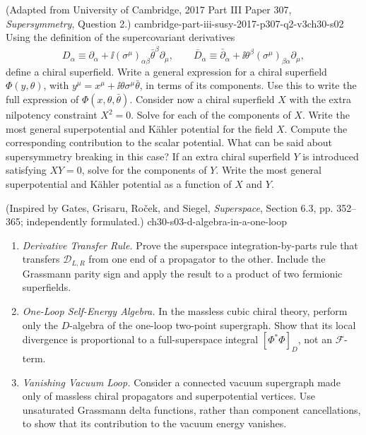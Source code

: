 \begin{enumerate}
    {(Adapted from University of Cambridge, 2017 Part III Paper 307, \emph{Supersymmetry}, Question 2.)}
    {cambridge-part-iii-susy-2017-p307-q2-v3ch30-s02}
  Using the definition of the supercovariant derivatives
  \[
    D_\alpha\equiv\partial_\alpha
      +\ii(\sigma^\mu)_{\alpha\dot\beta}\bar\theta^{\dot\beta}\partial_\mu,
    \qquad
    \bar D_{\dot\alpha}\equiv\bar\partial_{\dot\alpha}
      +\ii\theta^\beta(\sigma^\mu)_{\beta\dot\alpha}\partial_\mu,
  \]
  define a chiral superfield.  Write a general expression for a chiral
  superfield \(\Phi(y,\theta)\), with
  \(y^\mu=x^\mu+\ii\theta\sigma^\mu\bar\theta\), in terms of its components.
  Use this to write the full expression of \(\Phi(x,\theta,\bar\theta)\).
  Consider now a chiral superfield \(X\) with the extra nilpotency constraint
  \(X^2=0\).  Solve for each of the components of \(X\).  Write the most
  general superpotential and K\"ahler potential for the field \(X\).  Compute
  the corresponding contribution to the scalar potential.  What can be said
  about supersymmetry breaking in this case?  If an extra chiral superfield
  \(Y\) is introduced satisfying \(XY=0\), solve for the components of \(Y\).
  Write the most general superpotential and K\"ahler potential as a function
  of \(X\) and \(Y\).

    {(Inspired by Gates, Grisaru, Ro\v{c}ek, and Siegel, \emph{Superspace}, Section 6.3, pp. 352--365; independently formulated.)}
    {ch30-s03-d-algebra-in-a-one-loop}
  \begin{enumerate}
    \item \emph{Derivative Transfer Rule.}
    Prove the superspace integration-by-parts rule that transfers
      \(\mathcal D_{L,R}\) from one end of a propagator to the other.
      Include the Grassmann parity sign and apply the result to a product
      of two fermionic superfields.
    \item \emph{One-Loop Self-Energy Algebra.}
    In the massless cubic chiral theory, perform only the \(D\)-algebra
      of the one-loop two-point supergraph.  Show that its local
      divergence is proportional to a full-superspace integral
      \([\Phi^*\Phi]_D\), not an \(\mathcal F\)-term.
    \item \emph{Vanishing Vacuum Loop.}
    Consider a connected vacuum supergraph made only of massless chiral
      propagators and superpotential vertices.  Use unsaturated Grassmann
      delta functions, rather than component cancellations, to show that
      its contribution to the vacuum energy vanishes.
  \end{enumerate}


\end{enumerate}
